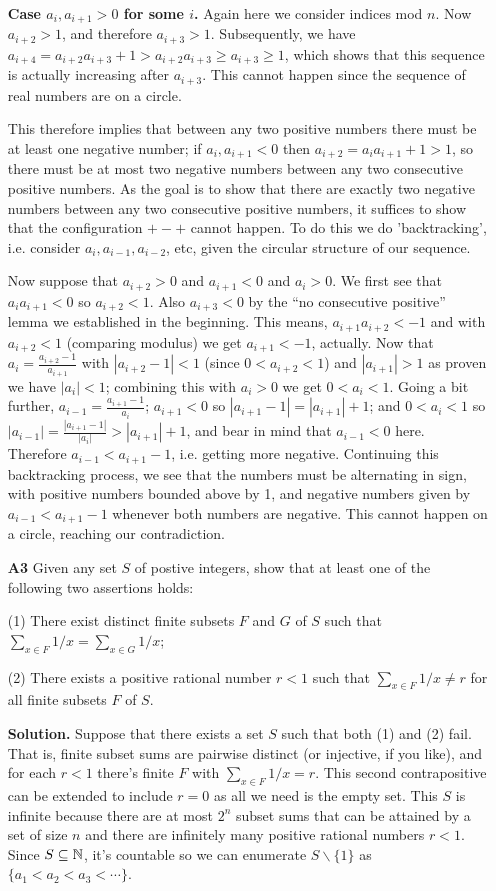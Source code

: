 \documentclass[11pt,a4paper]{article}
\begin{document}
\begin{enumerate}
	
	\textbf{Case $a_i, a_{i+1}>0$ for some $i$.} Again here we consider indices mod $n$. Now $a_{i+2}>1$, and therefore $a_{i+3}>1$. Subsequently, we have $a_{i+4}=a_{i+2}a_{i+3}+1>a_{i+2}a_{i+3}\ge a_{i+3}\ge 1$, which shows that this sequence is actually increasing after $a_{i+3}$. This cannot happen since the sequence of real numbers are on a circle.
	
	This therefore implies that between any two positive numbers there must be at least one negative number; if $a_{i}, a_{i+1}<0$ then $a_{i+2}=a_{i}a_{i+1}+1>1$, so there must be at most two negative numbers between any two consecutive positive numbers. As the goal is to show that there are exactly two negative numbers between any two consecutive positive numbers, it suffices to show that the configuration $+-+$ cannot happen. To do this we do 'backtracking', i.e. consider $a_i, a_{i-1}, a_{i-2}$, etc, given the circular structure of our sequence.
	
	Now suppose that $a_{i+2}>0$ and $a_{i+1}<0$ and $a_i>0$. We first see that $a_ia_{i+1}<0$ so $a_{i+2}<1$. Also $a_{i+3}<0$ by the ``no consecutive positive'' lemma we established in the beginning. This means, $a_{i+1}a_{i+2}<-1$ and with $a_{i+2}<1$ (comparing modulus) we get $a_{i+1}<-1$, actually. Now that $a_i=\frac{a_{i+2}-1}{a_{i+1}}$ with $|a_{i+2}-1|<1$ (since $0<a_{i+2}<1$) and $|a_{i+1}|>1$ as proven we have $|a_i|<1$; combining this with $a_i>0$ we get $0<a_i<1$. Going a bit further, $a_{i-1}=\frac{a_{i+1}-1}{a_{i}}$; $a_{i+1}<0$ so $|a_{i+1}-1|=|a_{i+1}|+1$; and $0<a_i<1$ so $|a_{i-1}|=\frac{|a_{i+1}-1|}{|a_{i}|}>|a_{i+1}|+1$, and bear in mind that $a_{i-1}<0$ here. Therefore $a_{i-1} <a_{i+1}-1$, i.e. getting more negative. Continuing this backtracking process, we see that the numbers must be alternating in sign, with positive numbers bounded above by 1, and negative numbers given by $a_{i-1} <a_{i+1}-1$ whenever both numbers are negative. This cannot happen on a circle, reaching our contradiction.
	
	\item [\textbf{A3}] 
	Given any set $S$ of postive integers, show that at least one of the following two assertions holds:
	
	(1) There exist distinct finite subsets $F$ and $G$ of $S$ such that $\sum_{x\in F}1/x=\sum_{x\in G}1/x$;
	
	(2) There exists a positive rational number $r<1$ such that $\sum_{x\in F}1/x\neq r$ for all finite subsets $F$ of $S$.
	
	\textbf{Solution.} Suppose that there exists a set $S$ such that both (1) and (2) fail. That is, finite subset sums are pairwise distinct (or injective, if you like), and for each $r<1$ there's finite $F$ with $\sum_{x\in F}1/x=r$. 
	This second contrapositive can be extended to include $r=0$ as all we need is the empty set. 
	This $S$ is infinite because there are at most $2^n$ subset sums that can be attained by a set of size $n$ and there are infinitely many positive rational numbers $r<1$. Since $S\subseteq{\mathbb N}$, it's countable so we can enumerate $S\backslash\{1\}$ as $\{a_1<a_2<a_3<\cdots\}$. 
	

\end{enumerate}
\end{document}
